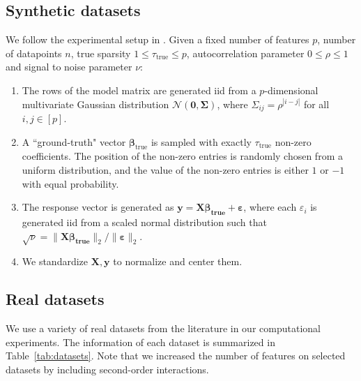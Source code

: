 \documentclass[mnsc,nonblindrev]{informs3} %
\begin{document}
\subsection{Synthetic datasets}\label{sec:synt_generation} We follow the experimental setup in \cite{bertsimas2020sparse2}. Given a fixed number of features $p$, number of datapoints $n$, true sparsity $1\leq \tau_{\text{true}}\leq p$, autocorrelation parameter $0\leq \rho\leq 1$ and signal to noise parameter $\nu$:
\begin{enumerate}
\item The rows of the model matrix are generated iid from a $p$-dimensional multivariate Gaussian distribution $\mathcal{N}(\bm{0},\bm{\Sigma})$, where $\Sigma_{ij}=\rho^{|i-j|}$ for all $i,j\in [p]$.
\item A ``ground-truth" vector $\bm{\beta}_{\text{true}}$ is sampled with exactly $\tau_{\text{true}}$ non-zero coefficients. The position of the non-zero entries is randomly chosen from a uniform distribution, and the value of the non-zero entries is either $1$ or $-1$ with equal probability.
\item The response vector is generated as $\bm{y}=\bm{X\beta_{\text{true}}}+\bm{\varepsilon}$, where each $\varepsilon_i$ is generated iid from a scaled normal distribution such that $\sqrt{\nu}=\|\bm{X\beta_{\text{true}}}\|_2/\|\bm{\varepsilon}\|_2$. 
\item We standardize $\bm{X}, \bm{y}$ to normalize and center them.
\end{enumerate}

\subsection{Real datasets}

We use a variety of real datasets from the literature in our computational experiments. The information of each dataset is summarized in Table~\ref{tab:datasets}. Note that we increased the number of features on selected datasets by including second-order interactions.%
\end{document}
